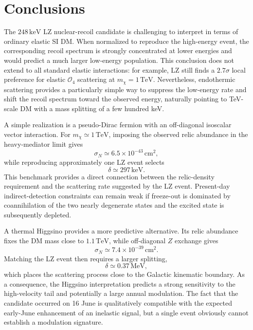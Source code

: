 \documentclass[aps,prd,reprint,superscriptaddress,nofootinbib,longbibliography,floatfix]{revtex4-2}
\newcommand{\TeV}{\mathrm{TeV}}
\newcommand{\keV}{\mathrm{keV}}
\begin{document}
\section{Conclusions}

The $248\,\keV$ LZ nuclear-recoil candidate is challenging to interpret in terms of ordinary elastic SI DM. When normalized to reproduce the high-energy event, the corresponding recoil spectrum is strongly concentrated at lower energies and would predict a much larger low-energy population. This conclusion does not extend to all standard elastic interactions: for example, LZ still finds a $2.7\sigma$ local preference for elastic $\mathcal{O}_4$ scattering at $m_\chi=1\,\TeV$. Nevertheless, endothermic scattering provides a particularly simple way to suppress the low-energy rate and shift the recoil spectrum toward the observed energy, naturally pointing to TeV-scale DM with a mass splitting of a few hundred keV.

A simple realization is a pseudo-Dirac fermion with an off-diagonal isoscalar vector interaction. For $m_\chi\simeq1\,\TeV$, imposing the observed relic abundance in the heavy-mediator limit gives
\begin{equation}
\sigma_N\simeq6.5\times10^{-43}\,\mathrm{cm}^2,
\end{equation}
while reproducing approximately one LZ event selects
\begin{equation}
\delta\simeq297\,\keV.
\end{equation}
This benchmark provides a direct connection between the relic-density requirement and the scattering rate suggested by the LZ event. Present-day indirect-detection constraints can remain weak if freeze-out is dominated by coannihilation of the two nearly degenerate states and the excited state is subsequently depleted.

A thermal Higgsino provides a more predictive alternative. Its relic abundance fixes the DM mass close to $1.1\,\TeV$, while off-diagonal $Z$ exchange gives
\begin{equation}
\sigma_N\simeq7.4\times10^{-39}\,\mathrm{cm}^2.
\end{equation}
Matching the LZ event then requires a larger splitting,
\begin{equation}
\delta\simeq0.37\,\mathrm{MeV},
\end{equation}
which places the scattering process close to the Galactic kinematic boundary. As a consequence, the Higgsino interpretation predicts a strong sensitivity to the high-velocity tail and potentially a large annual modulation. The fact that the candidate occurred on 16 June is qualitatively compatible with the expected early-June enhancement of an inelastic signal, but a single event obviously cannot establish a modulation signature.
\end{document}
